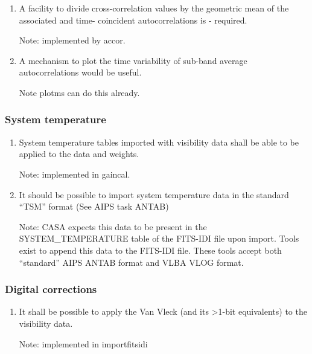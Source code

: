 \documentclass[11pt,a4paper]{article}
\begin{document}
\begin{enumerate}[subsubseclist]

\item A facility to divide cross-correlation values by the geometric
  mean of the associated and time- coincident autocorrelations is -
  required.

  Note: implemented by accor.

\item A mechanism to plot the time variability of sub-band average
  autocorrelations would be useful.

  Note plotms can do this already.
  
\end{enumerate}

\subsubsection{System temperature}

\begin{enumerate}[subsubseclist]

  \item System temperature tables imported with visibility data shall
    be able to be applied to the data and weights.

    Note: implemented in gaincal.

  \item It should be possible to import system temperature data in the
    standard ``TSM'' format (See AIPS task ANTAB)

    Note: CASA expects this data to be present in the
    SYSTEM\_TEMPERATURE table of the FITS-IDI file upon import.  Tools
    exist to append this data to the FITS-IDI file.  These tools
    accept both ``standard'' AIPS ANTAB format and VLBA VLOG format.

\end{enumerate}

\subsubsection{Digital corrections}

\begin{enumerate}[subsubseclist]

\item It shall be possible to apply the Van Vleck (and its >1-bit
  equivalents) to the visibility data.

  Note: implemented in importfitsidi

\end{enumerate}
\end{document}
